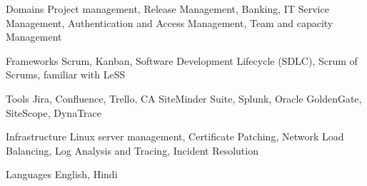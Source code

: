 

\begin{cvskills}

  \cvskill
    {Domains} %
    {Project management, Release Management, Banking, IT Service Management, Authentication and Access Management, Team and capacity Management} %

  \cvskill
    {Frameworks} %
    {Scrum, Kanban, Software Development Lifecycle (SDLC), Scrum of Scrums, familiar with LeSS} %

  \cvskill
    {Tools} %
    {Jira, Confluence, Trello, CA SiteMinder Suite, Splunk, Oracle GoldenGate, SiteScope, DynaTrace} %

  \cvskill
    {Infrastructure} %
    {Linux server management, Certificate Patching, Network Load Balancing, Log Analysis and Tracing, Incident Resolution} %

  \cvskill
    {Languages} %
    {English, Hindi} %

\end{cvskills}
